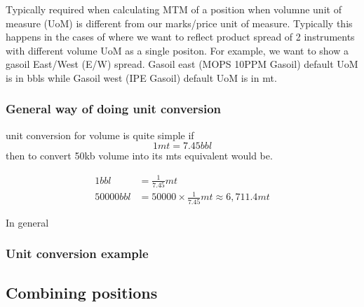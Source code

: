 \documentclass{article}
\begin{document}
Typically required when calculating MTM of a position when volumne unit of measure (UoM) is different from our marks/price unit of measure. Typically this happens in the cases of where we want to reflect product spread of 2 instruments with different volume UoM as a single positon. For example, we want to show a gasoil East/West (E/W) spread. Gasoil east (MOPS 10PPM Gasoil) default UoM is in bbls while Gasoil west (IPE Gasoil) default UoM is in mt. 

\subsubsection{General way of doing unit conversion}

unit conversion for volume is quite simple if  $$1mt = 7.45bbl$$ then to convert 50kb volume into its mts equivalent would be.

\begin{equation*}
    \begin{aligned}
        1bbl & = \frac{1}{7.45}mt \\ 
        50000bbl & = 50000 \times \frac{1}{7.45}mt \approx 6,711.4mt
    \end{aligned}    
\end{equation*}


In general 



\subsubsection{Unit conversion example}
\subsection{Combining positions}
\end{document}
